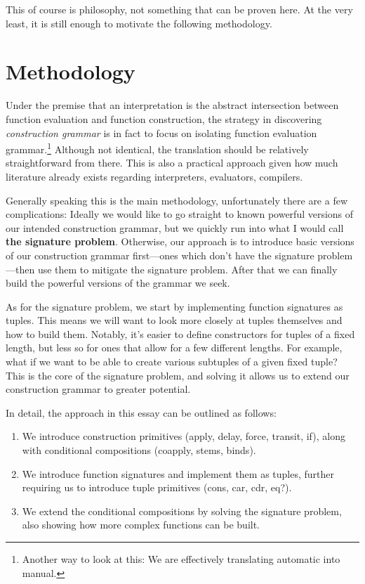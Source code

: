 \documentclass[twoside]{article}
\newcommand{\strong}[1]{{\bfseries #1}}
\begin{document}
This of course is philosophy, not something that can be proven here. At the very least, it is still enough to
motivate the following methodology.

\section*{Methodology}

Under the premise that an interpretation is the abstract intersection between function evaluation and function
construction, the strategy in discovering \emph{construction grammar} is in fact to focus on isolating function
evaluation grammar.\footnote{Another way to look at this: We are effectively translating automatic into manual.}
Although not identical, the translation should be relatively straightforward from there. This is also a practical
approach given how much literature already exists regarding interpreters, evaluators, compilers.

Generally speaking this is the main methodology, unfortunately there are a few complications: Ideally we would like
to go straight to known powerful versions of our intended construction grammar, but we quickly run into what I would
call \strong{the signature problem}. Otherwise, our approach is to introduce basic versions of our construction
grammar first---ones which don't have the signature problem---then use them to mitigate the signature problem.
After that we can finally build the powerful versions of the grammar we seek.

As for the signature problem, we start by implementing function signatures as tuples. This means we will want to look
more closely at tuples themselves and how to build them. Notably, it's easier to define constructors for tuples of a fixed
length, but less so for ones that allow for a few different lengths. For example, what if we want to be able to create various
subtuples of a given fixed tuple? This is the core of the signature problem, and solving it allows us to extend our construction
grammar to greater potential.

In detail, the approach in this essay can be outlined as follows:

\begin{enumerate}
\item We introduce construction primitives (apply, delay, force, transit, if), along with conditional compositions
      (coapply, stems, binds).
\item We introduce function signatures and implement them as tuples, further requiring us to introduce tuple primitives
      (cons, car, cdr, eq?).
\item We extend the conditional compositions by solving the signature problem, also showing how more complex functions can be built.
\end{enumerate}
\end{document}
